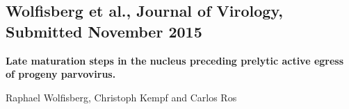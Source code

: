 


\pagestyle{empty}




\begin{center}
\setcounter{chapter}{0}
\chapter{Wolfisberg et al., Journal of Virology, Submitted November 2015}

\bigskip
\bigskip
\bigskip
\bigskip

\LARGE{\textbf{Late maturation steps in the nucleus preceding prelytic active egress of
progeny parvovirus.}}

\bigskip
\bigskip
\bigskip

Raphael Wolfisberg, Christoph Kempf and Carlos Ros
\end{center}







\setcounter{chapter}{9}
